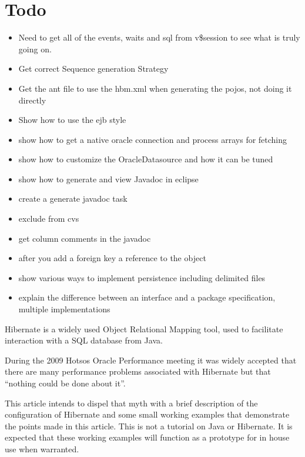 
\maketitle

\section{Todo}

\begin{itemize}
 \item Need to get all of the events, waits and sql from v\$session to see what is truly going on.
 \item Get correct Sequence generation Strategy 
 \item Get the ant file to use the hbm.xml when generating the pojos, not doing it directly
 \item Show how to use the ejb style
 \item show how to get a native oracle connection and process arrays for fetching
 \item show how to customize the OracleDatasource and how it can be tuned 
 \item show how to generate and view Javadoc in eclipse
 \item create a generate javadoc task
 \item exclude from cvs 
 \item get column comments in the javadoc
 \item after you add a foreign key a reference to the object 
 \item show various ways to implement persistence including delimited files
 \item explain the difference between an interface and a package specification, multiple implementations
\end{itemize}



Hibernate is a widely used Object Relational Mapping tool, used to facilitate interaction with a SQL database from Java.

During the 2009 Hotsos Oracle Performance meeting it was widely accepted that there are many performance problems associated
with Hibernate but that ``nothing could be done about it''.

This article intends to dispel that myth with a brief description of the configuration of Hibernate and some small working
examples that demonstrate the points made in this article.  This is not a tutorial on Java or Hibernate.  It is expected that
these working examples will function as a prototype for in house use when warranted.  

